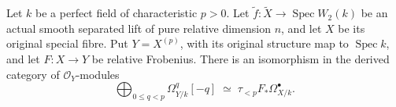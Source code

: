 \begin{theorem}
\label{thm:di-actual-witt-truncated-decomposition}
\leanok
{}
Let $k$ be a perfect field of characteristic $p>0$. Let
$\widetilde f:\widetilde X\to\operatorname{Spec}W_2(k)$ be an actual
smooth separated lift of pure relative dimension $n$, and let $X$ be its
original special fibre. Put $Y=X^{(p)}$, with its original structure map
to $\operatorname{Spec}k$, and let $F:X\to Y$ be relative Frobenius.
There is an isomorphism in the derived category of $\mathcal O_Y$-modules
\[
 \bigoplus_{0\le q<p}\Omega^q_{Y/k}[-q]
   \;\simeq\; \tau_{<p}F_*\Omega^\bullet_{X/k}.
\]
\end{theorem}
